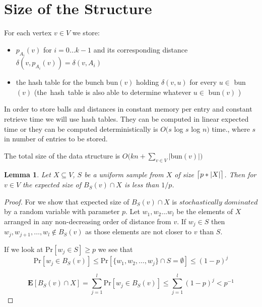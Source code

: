 \documentclass[shortabstract, lic, english]{iithesis}
\theoremstyle{definition} \newtheorem{definition}{Definition}[chapter]
\theoremstyle{remark} \newtheorem{remark}[definition]{Observation}
\theoremstyle{plain} \newtheorem{theorem}[definition]{Theorem}
\theoremstyle{plain} \newtheorem{lemma}[definition]{Lemma}
\theoremstyle{plain} \newtheorem{conjecture}[definition]{Conjecture}
\DeclarePairedDelimiter{\ceil}{\lceil}{\rceil}
\begin{document}
\section{Size of the Structure}

For each vertex $v \in V$ we store:
\begin{itemize}
    \item $p_{A_i}(v)$ for $i=0 \ldots k-1$ and its corresponding distance 
    $\delta(v, p_{A_i}(v)) = \delta(v, A_i)$
    \item the hash table for the bunch bun$(v)$ holding $\delta(v, u)$ for every $u \in $ bun$(v)$
    (the~hash~table is also able to determine whatever $u \in $ bun$(v)$ )
\end{itemize}

In order to store balls and distances in constant memory per entry and constant retrieve time we will use hash tables.
They can be computed in linear expected time\cite{2LevelHashTable} or
they can be computed deterministically is $O(s $ log $ s $ log $ n)$ time.\cite{hashTableDerandomization}, where $s$ in number of entries to be stored.

The total size of the data structure is $O(kn + \sum_{v \in V}|$bun$(v)|)$

\begin{lemma} \label{ballSize}
    Let $X \subseteq V$, $S$ be a uniform sample from $X$ of size $\ceil[\big]{p * |X|}$.
    Then for $v \in V$ the expected size of $B_{S}(v) \cap X$ is less than $1/p$.
\end{lemma}

\begin{proof}
    For we show that expected size of $B_{S}(v) \cap X$ is
    $stochastically$ $dominated$ by a random variable with parameter $p$.
    Let $w_1, w_2 \ldots w_l$ be the elements of $X$ arranged in any non-decreasing order of distance from $v$.
    If $w_j \in S$ then $w_j, w_{j+1}, \ldots , w_l \notin B_{S}(v)$
    as those elements are not closer to $v$ than $S$.

    If we look at Pr$[w_j \in S] \geq p$ we see that 
    $$\text{Pr}[w_j \in B_{S}(v)] \leq
    \text{Pr}[\{w_1, w_2, \ldots, w_j\} \cap S = \emptyset] \leq (1 - p)^j$$
    
    $$\mathbf{E}[B_{S}(v) \cap X] = \sum_{j=1}^{l} \text{Pr}[w_j \in B_{S}(v)] \leq \sum_{j=1}^{l}(1-p)^j < p^{-1}$$
\end{proof}
\end{document}
